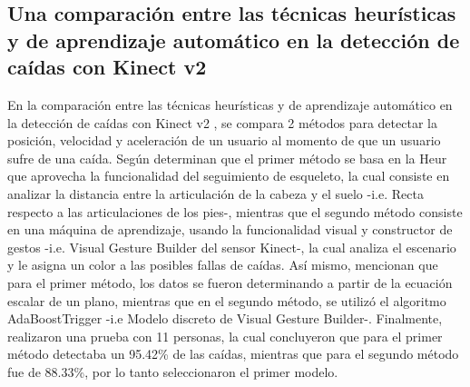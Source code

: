 \subsection{Una comparaci\'on entre las t\'ecnicas heur\'isticas y de aprendizaje autom\'atico en la detecci\'on de ca\'idas con Kinect v2} \label{tr:7}
En la comparaci\'on entre las t\'ecnicas heur\'isticas y de aprendizaje autom\'atico en la detecci\'on de ca\'idas con Kinect v2 \cite{amini2016comparison}, se compara 2 m\'etodos para detectar la posici\'on, velocidad y aceleraci\'on de un usuario al momento de que un usuario sufre de una ca\'ida.
\medbreak 
Seg\'un  determinan que  el primer m\'etodo se basa en la \gls{Heur} que aprovecha la funcionalidad del seguimiento de esqueleto, la cual consiste en analizar la distancia entre la articulaci\'on de la cabeza y el suelo -i.e. Recta respecto a las articulaciones de los pies-, mientras que el segundo m\'etodo consiste en una m\'aquina de aprendizaje, usando la funcionalidad visual y constructor de gestos -i.e. Visual Gesture Builder del sensor Kinect-, la cual analiza el escenario y le asigna un color a las posibles fallas de ca\'idas.
\medbreak 
As\'i mismo,  mencionan que para el primer m\'etodo, los datos se fueron determinando a partir de la ecuaci\'on escalar de un plano, mientras que en el segundo m\'etodo, se utiliz\'o el algoritmo AdaBoostTrigger -i.e Modelo discreto de Visual Gesture Builder-.
\medbreak 
Finalmente,  realizaron una prueba con 11 personas, la cual concluyeron que para el primer m\'etodo detectaba un 95.42\% de las ca\'idas, mientras que para el segundo m\'etodo fue de 88.33\%, por lo tanto seleccionaron el primer modelo.
